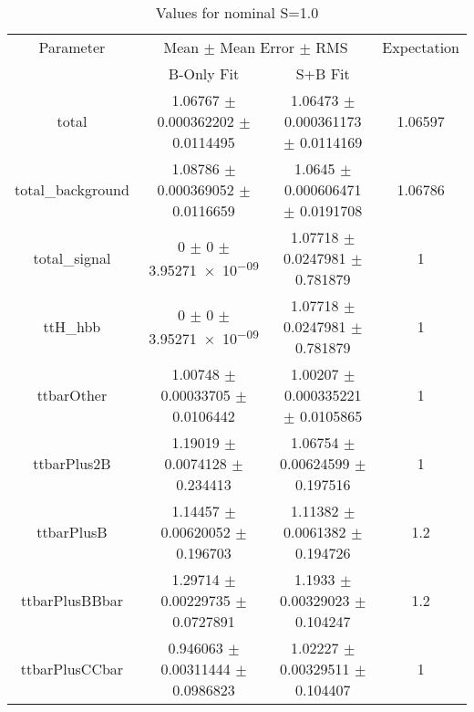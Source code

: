 \begin{table}
\centering
\caption{Values for nominal S=1.0}
\begin{tabular}{cccc}
\toprule
Parameter & \multicolumn{2}{c}{Mean $\pm$ Mean Error $\pm$ RMS} & Expectation\\
 & B-Only Fit & S+B Fit & \\
\midrule
total & \num{1.06767} $\pm$ \num{0.000362202} $\pm$ \num{0.0114495} & \num{1.06473} $\pm$ \num{0.000361173} $\pm$ \num{0.0114169} & \num{1.06597}\\
total\_background & \num{1.08786} $\pm$ \num{0.000369052} $\pm$ \num{0.0116659} & \num{1.0645} $\pm$ \num{0.000606471} $\pm$ \num{0.0191708} & \num{1.06786}\\
total\_signal & \num{0} $\pm$ \num{0} $\pm$ \num{3.95271e-09} & \num{1.07718} $\pm$ \num{0.0247981} $\pm$ \num{0.781879} & \num{1}\\
ttH\_hbb & \num{0} $\pm$ \num{0} $\pm$ \num{3.95271e-09} & \num{1.07718} $\pm$ \num{0.0247981} $\pm$ \num{0.781879} & \num{1}\\
ttbarOther & \num{1.00748} $\pm$ \num{0.00033705} $\pm$ \num{0.0106442} & \num{1.00207} $\pm$ \num{0.000335221} $\pm$ \num{0.0105865} & \num{1}\\
ttbarPlus2B & \num{1.19019} $\pm$ \num{0.0074128} $\pm$ \num{0.234413} & \num{1.06754} $\pm$ \num{0.00624599} $\pm$ \num{0.197516} & \num{1}\\
ttbarPlusB & \num{1.14457} $\pm$ \num{0.00620052} $\pm$ \num{0.196703} & \num{1.11382} $\pm$ \num{0.0061382} $\pm$ \num{0.194726} & \num{1.2}\\
ttbarPlusBBbar & \num{1.29714} $\pm$ \num{0.00229735} $\pm$ \num{0.0727891} & \num{1.1933} $\pm$ \num{0.00329023} $\pm$ \num{0.104247} & \num{1.2}\\
ttbarPlusCCbar & \num{0.946063} $\pm$ \num{0.00311444} $\pm$ \num{0.0986823} & \num{1.02227} $\pm$ \num{0.00329511} $\pm$ \num{0.104407} & \num{1}\\
\bottomrule
\end{tabular}
\end{table}